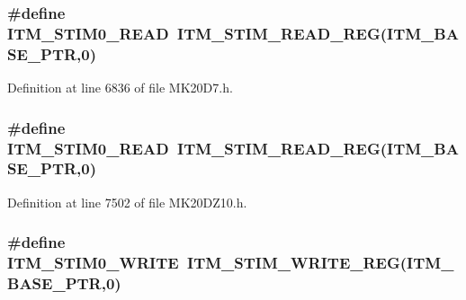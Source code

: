 \subsubsection[{\texorpdfstring{I\+T\+M\+\_\+\+S\+T\+I\+M0\+\_\+\+R\+E\+AD}{ITM_STIM0_READ}}]{\setlength{\rightskip}{0pt plus 5cm}\#define I\+T\+M\+\_\+\+S\+T\+I\+M0\+\_\+\+R\+E\+AD~{\bf I\+T\+M\+\_\+\+S\+T\+I\+M\+\_\+\+R\+E\+A\+D\+\_\+\+R\+EG}({\bf I\+T\+M\+\_\+\+B\+A\+S\+E\+\_\+\+P\+TR},0)}\hypertarget{group___i_t_m___register___accessor___macros_ga41eefae93b44a2616fd9feac9188bd5b}{}\label{group___i_t_m___register___accessor___macros_ga41eefae93b44a2616fd9feac9188bd5b}


Definition at line 6836 of file M\+K20\+D7.\+h.

\subsubsection[{\texorpdfstring{I\+T\+M\+\_\+\+S\+T\+I\+M0\+\_\+\+R\+E\+AD}{ITM_STIM0_READ}}]{\setlength{\rightskip}{0pt plus 5cm}\#define I\+T\+M\+\_\+\+S\+T\+I\+M0\+\_\+\+R\+E\+AD~{\bf I\+T\+M\+\_\+\+S\+T\+I\+M\+\_\+\+R\+E\+A\+D\+\_\+\+R\+EG}({\bf I\+T\+M\+\_\+\+B\+A\+S\+E\+\_\+\+P\+TR},0)}\hypertarget{group___i_t_m___register___accessor___macros_ga41eefae93b44a2616fd9feac9188bd5b}{}\label{group___i_t_m___register___accessor___macros_ga41eefae93b44a2616fd9feac9188bd5b}


Definition at line 7502 of file M\+K20\+D\+Z10.\+h.

\subsubsection[{\texorpdfstring{I\+T\+M\+\_\+\+S\+T\+I\+M0\+\_\+\+W\+R\+I\+TE}{ITM_STIM0_WRITE}}]{\setlength{\rightskip}{0pt plus 5cm}\#define I\+T\+M\+\_\+\+S\+T\+I\+M0\+\_\+\+W\+R\+I\+TE~{\bf I\+T\+M\+\_\+\+S\+T\+I\+M\+\_\+\+W\+R\+I\+T\+E\+\_\+\+R\+EG}({\bf I\+T\+M\+\_\+\+B\+A\+S\+E\+\_\+\+P\+TR},0)}\hypertarget{group___i_t_m___register___accessor___macros_gac29b16f3533cac91bfa55b3ed6a9e14d}{}\label{group___i_t_m___register___accessor___macros_gac29b16f3533cac91bfa55b3ed6a9e14d}


